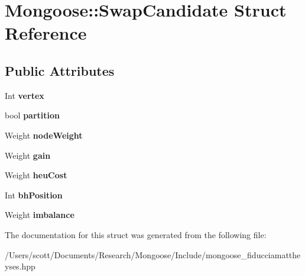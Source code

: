\hypertarget{struct_mongoose_1_1_swap_candidate}{}\section{Mongoose\+:\+:Swap\+Candidate Struct Reference}
\label{struct_mongoose_1_1_swap_candidate}
\subsection*{Public Attributes}
\begin{DoxyCompactItemize}
\item 
Int {\bfseries vertex}\hypertarget{struct_mongoose_1_1_swap_candidate_a3e4079261821405a9da07c73698affbe}{}\label{struct_mongoose_1_1_swap_candidate_a3e4079261821405a9da07c73698affbe}

\item 
bool {\bfseries partition}\hypertarget{struct_mongoose_1_1_swap_candidate_a90c6040412c04f4b8fd76431166bd20f}{}\label{struct_mongoose_1_1_swap_candidate_a90c6040412c04f4b8fd76431166bd20f}

\item 
Weight {\bfseries node\+Weight}\hypertarget{struct_mongoose_1_1_swap_candidate_a1499c91e26791e8d128486bc7f8863ab}{}\label{struct_mongoose_1_1_swap_candidate_a1499c91e26791e8d128486bc7f8863ab}

\item 
Weight {\bfseries gain}\hypertarget{struct_mongoose_1_1_swap_candidate_aca751a5057599840508a0f7c502f7beb}{}\label{struct_mongoose_1_1_swap_candidate_aca751a5057599840508a0f7c502f7beb}

\item 
Weight {\bfseries heu\+Cost}\hypertarget{struct_mongoose_1_1_swap_candidate_a27282802fd8e0d200f10361b4d2ec976}{}\label{struct_mongoose_1_1_swap_candidate_a27282802fd8e0d200f10361b4d2ec976}

\item 
Int {\bfseries bh\+Position}\hypertarget{struct_mongoose_1_1_swap_candidate_ac5719cdece2cfd40787060177e07e24e}{}\label{struct_mongoose_1_1_swap_candidate_ac5719cdece2cfd40787060177e07e24e}

\item 
Weight {\bfseries imbalance}\hypertarget{struct_mongoose_1_1_swap_candidate_a83d2a65ccc8aa2806b152db6c9c4bd7e}{}\label{struct_mongoose_1_1_swap_candidate_a83d2a65ccc8aa2806b152db6c9c4bd7e}

\end{DoxyCompactItemize}


The documentation for this struct was generated from the following file\+:\begin{DoxyCompactItemize}
\item 
/\+Users/scott/\+Documents/\+Research/\+Mongoose/\+Include/mongoose\+\_\+fiducciamattheyses.\+hpp\end{DoxyCompactItemize}
